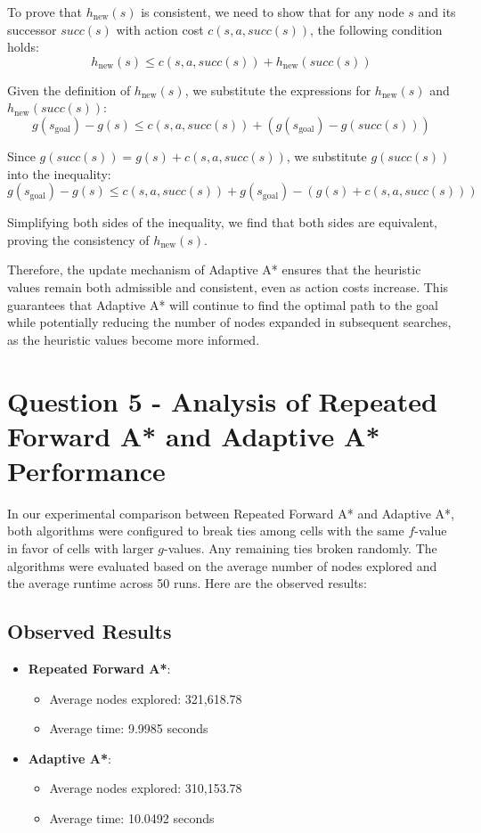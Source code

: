 \documentclass{article}
\begin{document}
To prove that \(h_{\text{new}}(s)\) is consistent, we need to show that for any node \(s\) and its successor \(succ(s)\) with action cost \(c(s, a, succ(s))\), the following condition holds:
\[h_{\text{new}}(s) \leq c(s, a, succ(s)) + h_{\text{new}}(succ(s))\]

Given the definition of \(h_{\text{new}}(s)\), we substitute the expressions for \(h_{\text{new}}(s)\) and \(h_{\text{new}}(succ(s))\):
\[g(s_{\text{goal}}) - g(s) \leq c(s, a, succ(s)) + \left(g(s_{\text{goal}}) - g(succ(s))\right)\]

Since \(g(succ(s)) = g(s) + c(s, a, succ(s))\), we substitute \(g(succ(s))\) into the inequality:
\[g(s_{\text{goal}}) - g(s) \leq c(s, a, succ(s)) + g(s_{\text{goal}}) - \left(g(s) + c(s, a, succ(s))\right)\]

Simplifying both sides of the inequality, we find that both sides are equivalent, proving the consistency of \(h_{\text{new}}(s)\).

Therefore, the update mechanism of Adaptive A* ensures that the heuristic values remain both admissible and consistent, even as action costs increase. This guarantees that Adaptive A* will continue to find the optimal path to the goal while potentially reducing the number of nodes expanded in subsequent searches, as the heuristic values become more informed.



\section{Question 5 - Analysis of Repeated Forward A* and Adaptive A* Performance}
In our experimental comparison between Repeated Forward A* and Adaptive A*, both algorithms were configured to break ties among cells with the same \(f\)-value in favor of cells with larger \(g\)-values. Any remaining ties broken randomly. The algorithms were evaluated based on the average number of nodes explored and the average runtime across 50 runs. Here are the observed results:

\subsection{Observed Results}

\begin{itemize}
    \item \textbf{Repeated Forward A*}:
    \begin{itemize}
        \item Average nodes explored: 321,618.78
        \item Average time: 9.9985 seconds
    \end{itemize}
    \item \textbf{Adaptive A*}:
    \begin{itemize}
        \item Average nodes explored: 310,153.78
        \item Average time: 10.0492 seconds
    \end{itemize}
\end{itemize}
\end{document}
